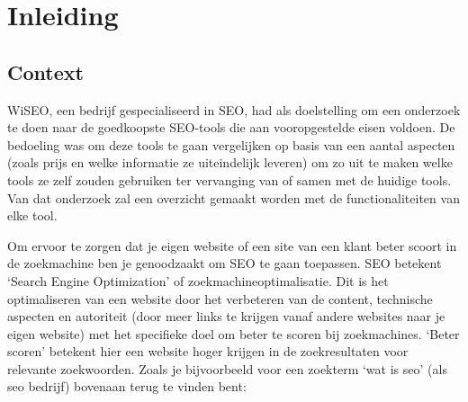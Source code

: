 
\chapter{Inleiding}
\label{ch:inleiding}

\section{Context}
\label{sec:context}

WiSEO, een bedrijf gespecialiseerd in SEO, had als doelstelling om een onderzoek te doen naar de goedkoopste SEO-tools die aan vooropgestelde eisen voldoen. De bedoeling was om deze tools te gaan vergelijken op basis van een aantal aspecten (zoals prijs en welke informatie ze uiteindelijk leveren) om zo uit te maken welke tools ze zelf zouden gebruiken ter vervanging van of samen met de huidige tools. Van dat onderzoek zal een overzicht gemaakt worden met de functionaliteiten van elke tool. 

Om ervoor te zorgen dat je eigen website of een site van een klant beter scoort in de zoekmachine ben je genoodzaakt om SEO te gaan toepassen. SEO betekent ‘Search Engine Optimization’ of zoekmachineoptimalisatie. Dit is het optimaliseren van een website door het verbeteren van de content, technische aspecten en autoriteit (door meer links te krijgen vanaf andere websites naar je eigen website) met het specifieke doel om beter te scoren bij zoekmachines. ‘Beter scoren’ betekent hier een website hoger krijgen in de zoekresultaten voor relevante zoekwoorden. Zoals je bijvoorbeeld voor een zoekterm ‘wat is seo’ (als seo bedrijf) bovenaan terug te vinden bent: 

